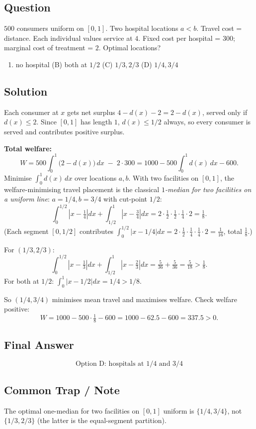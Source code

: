 \documentclass[11pt]{article}
\begin{document}
\subsection*{Question}
$500$ consumers uniform on $[0,1]$. Two hospital locations $a<b$. Travel cost = distance. Each individual values service at $4$. Fixed cost per hospital = $300$; marginal cost of treatment = $2$. Optimal locations?
\begin{enumerate}[label=(\Alph*)]
\item no hospital \quad (B) both at $1/2$ \quad (C) $1/3,2/3$ \quad (D) $1/4,3/4$
\end{enumerate}

\subsection*{Solution}
Each consumer at $x$ gets net surplus $4-d(x)-2=2-d(x)$, served only if $d(x)\le 2$. Since $[0,1]$ has length $1$, $d(x)\le 1/2$ always, so every consumer is served and contributes positive surplus.

\medskip\noindent\textbf{Total welfare:}
\[
W=500\int_0^1 \bigl(2-d(x)\bigr)\,dx \;-\; 2\cdot 300=1000-500\int_0^1 d(x)\,dx -600.
\]
Minimise $\int_0^1 d(x)\,dx$ over locations $a,b$. With two facilities on $[0,1]$, the welfare-minimising travel placement is the classical \emph{$1$-median for two facilities on a uniform line}: $a=1/4,b=3/4$ with cut-point $1/2$:
\[
\int_0^{1/2}|x-\tfrac14|dx+\int_{1/2}^{1}|x-\tfrac34|dx=2\cdot \tfrac{1}{2}\cdot\tfrac{1}{2}\cdot\tfrac{1}{4}\cdot 2=\tfrac{1}{8}.
\]
(Each segment $[0,1/2]$ contributes $\int_0^{1/2}|x-1/4|dx=2\cdot \frac{1}{2}\cdot \frac{1}{4}\cdot \frac{1}{4}\cdot 2 = \frac{1}{16}$, total $\frac{1}{8}$.)

\medskip\noindent For $(1/3,2/3)$:
\[
\int_0^{1/2}|x-\tfrac13|dx+\int_{1/2}^{1}|x-\tfrac23|dx = \tfrac{5}{36}+\tfrac{5}{36}=\tfrac{5}{18}>\tfrac{1}{8}.
\]
For both at $1/2$: $\int_0^1|x-1/2|dx=1/4>1/8$.

So $(1/4,3/4)$ minimises mean travel and maximises welfare. Check welfare positive:
\[
W=1000-500\cdot\tfrac{1}{8}-600=1000-62.5-600=337.5>0.
\]

\subsection*{Final Answer}
\[
\boxed{\text{Option D: hospitals at } 1/4 \text{ and } 3/4}
\]

\subsection*{Common Trap / Note}
The optimal one-median for two facilities on $[0,1]$ uniform is $\{1/4,3/4\}$, not $\{1/3,2/3\}$ (the latter is the equal-segment partition).
\end{document}
